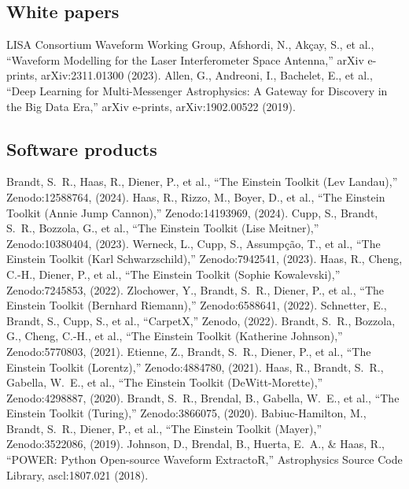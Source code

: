 \subsection{White papers}
 LISA Consortium Waveform Working Group, Afshordi, N., Ak{\c{c}}ay, S., et al., ``Waveform Modelling for the Laser Interferometer Space Antenna,'' arXiv e-prints, arXiv:2311.01300 (2023).
 Allen, G., Andreoni, I., Bachelet, E., et al., ``Deep Learning for Multi-Messenger Astrophysics: A Gateway for Discovery in the Big Data Era,'' arXiv e-prints, arXiv:1902.00522 (2019).

\subsection{Software products}
 Brandt, S.~R., Haas, R., Diener, P., et al., ``The Einstein Toolkit (Lev Landau),'' Zenodo:12588764, (2024).
 Haas, R., Rizzo, M., Boyer, D., et al., ``The Einstein Toolkit (Annie Jump Cannon),'' Zenodo:14193969, (2024).
 Cupp, S., Brandt, S.~R., Bozzola, G., et al., ``The Einstein Toolkit (Lise Meitner),'' Zenodo:10380404, (2023).
 Werneck, L., Cupp, S., Assump{\c{c}}{\~a}o, T., et al., ``The Einstein Toolkit (Karl Schwarzschild),'' Zenodo:7942541, (2023).
 Haas, R., Cheng, C.-H., Diener, P., et al., ``The Einstein Toolkit (Sophie Kowalevski),'' Zenodo:7245853, (2022).
 Zlochower, Y., Brandt, S.~R., Diener, P., et al., ``The Einstein Toolkit (Bernhard Riemann),'' Zenodo:6588641, (2022).
 Schnetter, E., Brandt, S., Cupp, S., et al., ``CarpetX,'' Zenodo, (2022).
 Brandt, S.~R., Bozzola, G., Cheng, C.-H., et al., ``The Einstein Toolkit (Katherine Johnson),'' Zenodo:5770803, (2021).
 Etienne, Z., Brandt, S.~R., Diener, P., et al., ``The Einstein Toolkit (Lorentz),'' Zenodo:4884780, (2021).
 Haas, R., Brandt, S.~R., Gabella, W.~E., et al., ``The Einstein Toolkit (DeWitt-Morette),'' Zenodo:4298887, (2020).
 Brandt, S.~R., Brendal, B., Gabella, W.~E., et al., ``The Einstein Toolkit (Turing),'' Zenodo:3866075, (2020).
 Babiuc-Hamilton, M., Brandt, S.~R., Diener, P., et al., ``The Einstein Toolkit (Mayer),'' Zenodo:3522086, (2019).
 Johnson, D., Brendal, B., Huerta, E.~A., \& Haas, R., ``POWER: Python Open-source Waveform ExtractoR,'' Astrophysics Source Code Library, ascl:1807.021 (2018).
